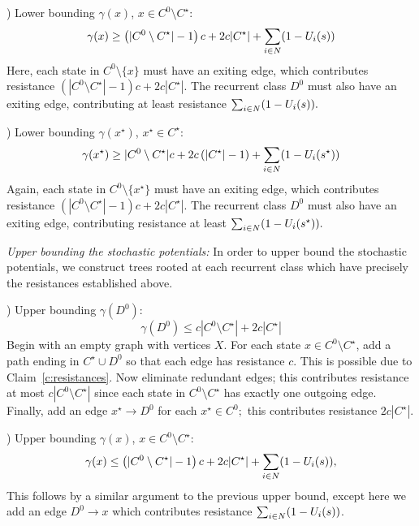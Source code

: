 \smallskip

) Lower bounding $\gamma(x)$, $x\in C^0\setminus C^\star$:
$$\gamma(x) \geq \left(|C^0\setminus C^\star| - 1\right)c + 2c|C^\star| + \sum_{i\in N}(1 - U_i(s))$$ 
 Here, each state in $C^0\setminus \{x\}$ must have an exiting edge, which contributes resistance $\left(|C^0\setminus C^\star| - 1\right)c + 2c|C^\star|.$ The recurrent class $D^0$ must also have an exiting edge, contributing at least resistance $\sum_{i\in N}(1 - U_i(s)).$

\smallskip

) Lower bounding $\gamma(x^\star)$, $x^\star\in C^\star$:
$$\gamma(x^\star) \geq |C^0\setminus C^\star|c + 2c\left(|C^\star|-1\right) + \sum_{i\in N}(1 - U_i(s^\star))$$ 
 Again, each state in $C^0\setminus \{x^\star\}$ must have an exiting edge, which contributes resistance $\left(|C^0\setminus C^\star| - 1\right)c + 2c|C^\star|.$ The recurrent class $D^0$ must also have an exiting edge, contributing resistance at least $\sum_{i\in N}(1 - U_i(s^\star)).$

\smallskip

\noindent\emph{Upper bounding the stochastic potentials:} In order to upper bound the stochastic potentials, we construct trees rooted at each recurrent class which have precisely the resistances established above.

\smallskip
) Upper bounding $\gamma(D^0)$:
$$\gamma(D^0) \leq c|C^0\setminus C^\star| + 2c|C^\star|$$ 
Begin with an empty graph with vertices $X$. For each state $x\in C^0\setminus C^\star$, add a path ending in $C^\star\cup D^0$ so that each edge has resistance $c$. This is possible due to Claim~\ref{c:resistances}. Now eliminate redundant edges; this contributes resistance at most $c|C^0\setminus C^\star|$ since each state in $C^0\setminus C^\star$ has exactly one outgoing edge. Finally, add an edge $x^\star \to D^0$ for each $x^\star\in C^0;$ this contributes resistance $2c|C^\star|$.

\smallskip

) Upper bounding $\gamma(x)$, $x\in C^0\setminus C^\star$:
$$\gamma(x) \leq \left(|C^0\setminus C^\star| - 1\right)c + 2c|C^\star| + \sum_{i\in N}(1 - U_i(s)),$$ 
 This follows by a similar argument to the previous upper bound, except here we add an edge $D^0 \to x$ which contributes resistance $\sum_{i\in N}(1 - U_i(s))$.

\smallskip

